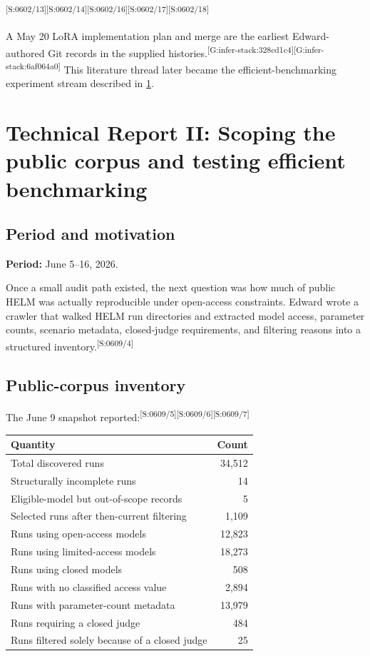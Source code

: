 \documentclass[11pt,oneside]{report}
\newcommand{\code}[1]{\texttt{\detokenize{#1}}}
\newcommand{\evmark}[1]{\allowbreak\textsuperscript{\scriptsize\textnormal{[#1]}}}
\newcommand{\slideref}[2]{\evmark{S:#1/#2}}
\newcommand{\gitref}[1]{\evmark{G:#1}}
\begin{document}
\slideref{0602}{13}\slideref{0602}{14}\slideref{0602}{16}\slideref{0602}{17}\slideref{0602}{18}

A May 20 \code{infer_stack} LoRA implementation plan and merge are the earliest Edward-authored Git records in the supplied histories.\gitref{infer-stack:328cd1c4}\gitref{infer-stack:6af064a0} This literature thread later became the efficient-benchmarking experiment stream described in \cref{ch:scope}.

\chapter{Technical Report II: Scoping the public corpus and testing efficient benchmarking}
\label{ch:scope}

\section{Period and motivation}

\textbf{Period:} June 5--16, 2026.

Once a small audit path existed, the next question was how much of public HELM was actually reproducible under open-access constraints. Edward wrote a crawler that walked HELM run directories and extracted model access, parameter counts, scenario metadata, closed-judge requirements, and filtering reasons into a structured inventory.\slideref{0609}{4}

\section{Public-corpus inventory}

The June 9 snapshot reported:\slideref{0609}{5}\slideref{0609}{6}\slideref{0609}{7}

\begin{longtable}{@{}P{0.46\textwidth}r@{}}
\toprule
Quantity & Count \\
\midrule
Total discovered runs & 34,512 \\
Structurally incomplete runs & 14 \\
Eligible-model but out-of-scope records & 5 \\
Selected runs after then-current filtering & 1,109 \\
Runs using open-access models & 12,823 \\
Runs using limited-access models & 18,273 \\
Runs using closed models & 508 \\
Runs with no classified access value & 2,894 \\
Runs with parameter-count metadata & 13,979 \\
Runs requiring a closed judge & 484 \\
Runs filtered solely because of a closed judge & 25 \\
\bottomrule
\end{longtable}
\end{document}
